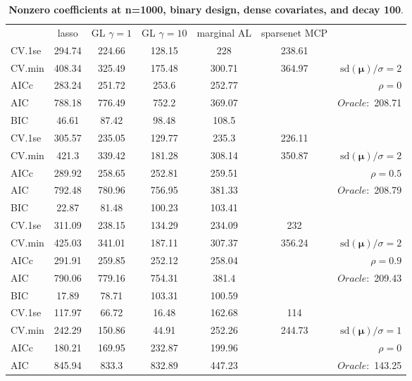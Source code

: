 \begin{table}\vspace{-.5cm}
\caption[l]{ { \bf Nonzero coefficients at n=1000, binary design, 
dense covariates, and  decay  100}.}
\vspace{-.5cm}
\footnotesize{}
\begin{center}
\begin{tabular}{l*{5}{c}|r}
& lasso & GL $\gamma=1$ & GL $\gamma=10$ & marginal AL & sparsenet MCP  & \\
 \cline{1-7}
CV.1se & 294.74 & 224.66 & 128.15 & 228 & 238.61 & \\
CV.min & 408.34 & 325.49 & 175.48 & 300.71 & 364.97 &  $\mathrm{sd}(\mathbf{\mu})/\sigma=2$ \\
AICc & 283.24 & 251.72 & 253.6 & 252.77 & & $\rho=0$ \\
AIC & 788.18 & 776.49 & 752.2 & 369.07 & &  \multirow{2}{*}{$Oracle: $ 208.71} \\
BIC & 46.61 & 87.42 & 98.48 & 108.5 & &  \\
 \hline 
CV.1se & 305.57 & 235.05 & 129.77 & 235.3 & 226.11 & \\
CV.min & 421.3 & 339.42 & 181.28 & 308.14 & 350.87 &  $\mathrm{sd}(\mathbf{\mu})/\sigma=2$ \\
AICc & 289.92 & 258.65 & 252.81 & 259.51 & & $\rho=0.5$ \\
AIC & 792.48 & 780.96 & 756.95 & 381.33 & &  \multirow{2}{*}{$Oracle: $ 208.79} \\
BIC & 22.87 & 81.48 & 100.23 & 103.41 & &  \\
 \hline 
CV.1se & 311.09 & 238.15 & 134.29 & 234.09 & 232 & \\
CV.min & 425.03 & 341.01 & 187.11 & 307.37 & 356.24 &  $\mathrm{sd}(\mathbf{\mu})/\sigma=2$ \\
AICc & 291.91 & 259.85 & 252.12 & 258.04 & & $\rho=0.9$ \\
AIC & 790.06 & 779.16 & 754.31 & 381.4 & &  \multirow{2}{*}{$Oracle: $ 209.43} \\
BIC & 17.89 & 78.71 & 103.31 & 100.59 & &  \\
 \hline 
CV.1se & 117.97 & 66.72 & 16.48 & 162.68 & 114 & \\
CV.min & 242.29 & 150.86 & 44.91 & 252.26 & 244.73 &  $\mathrm{sd}(\mathbf{\mu})/\sigma=1$ \\
AICc & 180.21 & 169.95 & 232.87 & 199.96 & & $\rho=0$ \\
AIC & 845.94 & 833.3 & 832.89 & 447.23 & &  \multirow{2}{*}{$Oracle: $ 143.25} \\

\end{tabular}
\end{center}
\end{table}
